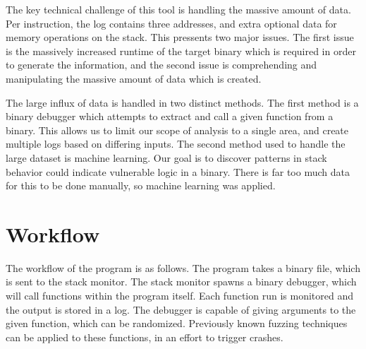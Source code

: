 \documentclass{article}
\begin{document}
The key technical challenge of this tool is handling the massive amount of data.
Per instruction, the log contains three addresses, and extra optional data for
memory operations on the stack. This pressents two major issues. The first issue
is the massively increased runtime of the target binary which is required in
order to generate the information, and the second issue is comprehending and
manipulating the massive amount of data which is created. \par
    The large influx of data is handled in two distinct methods. The first method
is a binary debugger which attempts to extract and call a given function from a
binary. This allows us to limit our scope of analysis to a single area, and
create multiple logs based on differing inputs. The second method used to handle
the large dataset is machine learning.  Our goal is to discover patterns in
stack behavior could indicate vulnerable logic in a binary.  There is far too
much data for this to be done manually, so machine learning was applied.

\section{Workflow}

The workflow of the program is as follows. The program takes a binary file,
which is sent to the stack monitor. The stack monitor spawns a binary debugger,
which will call functions within the program itself. Each function run is
monitored and the output is stored in a log. The debugger is capable of giving
arguments to the given function, which can be randomized. Previously known
fuzzing techniques can be applied to these functions, in an effort to trigger
crashes.
\end{document}

